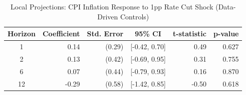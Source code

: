 \begin{table}[ht]
\centering
\caption{Local Projections: CPI Inflation Response to 1pp Rate Cut Shock (Data-Driven Controls)} 
\label{tab:lp_cpi}
\begin{tabular}{crrcrr}
  \toprule
Horizon & Coefficient & Std. Error & 95\% CI & t-statistic & p-value \\ 
  \midrule
  1 & 0.14 & (0.29) & [-0.42, 0.70] & 0.49 & 0.627 \\ 
    2 & 0.13 & (0.42) & [-0.69, 0.95] & 0.31 & 0.755 \\ 
    6 & 0.07 & (0.44) & [-0.79, 0.93] & 0.16 & 0.870 \\ 
   12 & -0.29 & (0.58) & [-1.42, 0.85] & -0.50 & 0.618 \\ 
   \bottomrule
\end{tabular}
\end{table}
